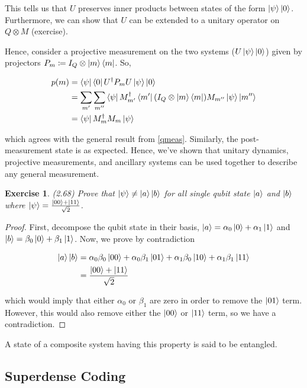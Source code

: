 \documentclass[11pt]{article}
\newcommand\0{\mathbf{0}}
\newcommand\<{\langle}
\renewcommand\>{\rangle}
\newtheorem{exercise}[theorem]{Exercise}
\begin{document}
This tells us that $U$ preserves inner products between states of the form $\ket{\psi}\ket{0}$. Furthermore, we can show that $U$ can be extended to a unitary operator on $Q \otimes M$ (exercise).

Hence, consider a projective measurement on the two systems ($U\ket{\psi}\ket{0}$) given by projectors $P_m \coloneqq I_Q \otimes \ket{m}\bra{m}$. So,

\begin{align*}
p(m) &= \bra{\psi} \bra{0} U^\dag P_m U \ket{\psi} \ket{0} \\
&= \sum_{m'}\sum_{m''} \bra{\psi} M_{m'}^\dag \bra{m'} (I_Q \otimes \ket{m}\bra{m})M_{m''} \ket{\psi} \ket{m''} \\
&= \bra{\psi} M_m^\dag M_m \ket{\psi}
\end{align*}

which agrees with the general result from \ref{qmeas}. Similarly, the post-measurement state is as expected. Hence, we've shown that unitary dynamics, projective measurements, and ancillary systems can be used together to describe any general measurement.

\begin{exercise}
(2.68) Prove that $\ket{\psi} \neq \ket{a}\ket{b}$ for all single qubit state $\ket{a}$ and $\ket{b}$ where $\ket{\psi} = \frac{\ket{00} + \ket{11}}{\sqrt{2}}$.
\end{exercise}

\begin{proof}
	First, decompose the qubit state in their basis, $\ket{a} = \alpha_0 \ket{0} + \alpha_1 \ket{1}$ and $\ket{b} = \beta_0 \ket{0} + \beta_1 \ket{1}$. Now, we prove by contradiction
	
	\begin{align*}
	\ket{a}\ket{b} &= \alpha_0\beta_0 \ket{00} + \alpha_0\beta_1 \ket{01} + \alpha_1\beta_0 \ket{10} + \alpha_1\beta_1 \ket{11} \\
	&= \frac{\ket{00} + \ket{11}}{\sqrt{2}}
	\end{align*}

which would imply that either $\alpha_0$ or $\beta_1$ are zero in order to remove the $\ket{01}$ term. However, this would also remove either the $\ket{00}$ or $\ket{11}$ term, so we have a contradiction.
\end{proof}

A state of a composite system having this property is said to be entangled. 

\subsection{Superdense Coding}
\end{document}
